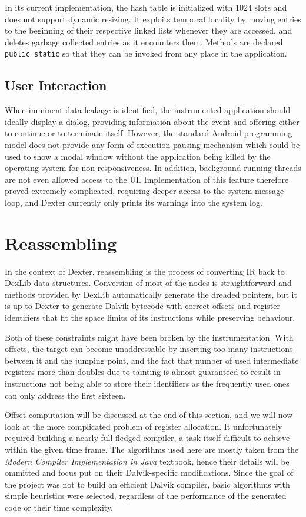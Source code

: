 \documentclass[12pt,twoside,notitlepage]{report}
\begin{document}
In its current implementation, the hash table is initialized with 1024 slots and does not support dynamic resizing. It exploits temporal locality by moving entries to the beginning of their respective linked lists whenever they are accessed, and deletes garbage collected entries as it encounters them. Methods are declared \verb$public static$ so that they can be invoked from any place in the application.

\subsection{User Interaction}

When imminent data leakage is identified, the instrumented application should ideally display a dialog, providing information about the event and offering either to continue or to terminate itself. However, the standard Android programming model does not provide any form of execution pausing mechanism which could be used to show a modal window without the application being killed by the operating system for non-responsiveness. In addition, background-running threads are not even allowed access to the UI. Implementation of this feature therefore proved extremely complicated, requiring deeper access to the system message loop, and Dexter currently only prints its warnings into the system log.

\section{Reassembling}

In the context of Dexter, reassembling is the process of converting IR back to DexLib data structures. Conversion of most of the nodes is straightforward and methods provided by DexLib automatically generate the dreaded pointers, but it is up to Dexter to generate Dalvik bytecode with correct offsets and register identifiers that fit the space limits of its instructions while preserving behaviour. 

Both of these constraints might have been broken by the instrumentation. With offsets, the target can become unaddressable by inserting too many instructions between it and the jumping point, and the fact that number of used intermediate registers more than doubles due to tainting is almost guaranteed to result in instructions not being able to store their identifiers as the frequently used ones can only address the first sixteen.

Offset computation will be discussed at the end of this section, and we will now look at the more complicated problem of register allocation. It unfortunately required building a nearly full-fledged compiler, a task itself difficult to achieve within the given time frame. The algorithms used here are mostly taken from the \emph{Modern Compiler Implementation in Java}\cite{Appel:2003:MCI:599718} textbook, hence their details will be ommitted and focus put on their Dalvik-specific modifications. Since the goal of the project was not to build an efficient Dalvik compiler, basic algorithms with simple heuristics were selected, regardless of the performance of the generated code or their time complexity.
\end{document}
